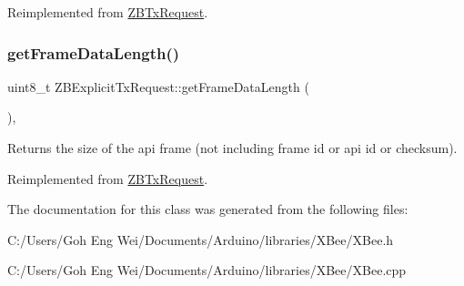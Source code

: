 Reimplemented from \hyperlink{class_z_b_tx_request_ac81e09dfbf7aefbdf7f8b4838b643c5c}{Z\+B\+Tx\+Request}.

\hypertarget{class_z_b_explicit_tx_request_a2dfcaf9ec7520f129b68966f814e318f}{}\label{class_z_b_explicit_tx_request_a2dfcaf9ec7520f129b68966f814e318f} 
\subsubsection{\texorpdfstring{get\+Frame\+Data\+Length()}{getFrameDataLength()}}
{\footnotesize\ttfamily uint8\+\_\+t Z\+B\+Explicit\+Tx\+Request\+::get\+Frame\+Data\+Length (\begin{DoxyParamCaption}{ }\end{DoxyParamCaption})\hspace{0.3cm}{\ttfamily [protected]}, {\ttfamily [virtual]}}

Returns the size of the api frame (not including frame id or api id or checksum). 

Reimplemented from \hyperlink{class_z_b_tx_request_a8e6914c1f556981a0f863c57c57d053b}{Z\+B\+Tx\+Request}.



The documentation for this class was generated from the following files\+:\begin{DoxyCompactItemize}
\item 
C\+:/\+Users/\+Goh Eng Wei/\+Documents/\+Arduino/libraries/\+X\+Bee/X\+Bee.\+h\item 
C\+:/\+Users/\+Goh Eng Wei/\+Documents/\+Arduino/libraries/\+X\+Bee/X\+Bee.\+cpp\end{DoxyCompactItemize}
